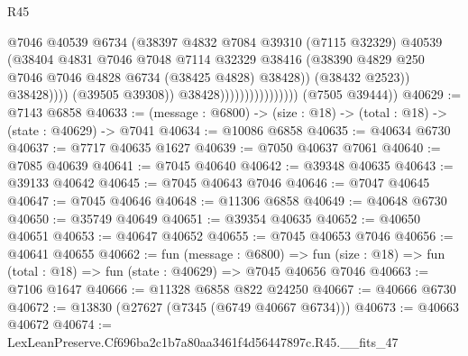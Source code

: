 \begin{lexlean}{R45}
\begin{coremodule}
{                                                @7046
                                                @40539
                                                @6734
                                                (@38397
                                                  @4832
                                                  @7084
                                                  @39310
                                                  (@7115 @32329)
                                                  @40539
                                                  (@38404
                                                    @4831
                                                    @7046
                                                    @7048
                                                    @7114
                                                    @32329
                                                    @38416
                                                    (@38390
                                                      @4829
                                                      @250
                                                      @7046
                                                      @7046
                                                      @4828
                                                      @6734
                                                      (@38425 @4828)
                                                      @38428))
                                                  (@38432 @2523))
                                                @38428))))
                                        (@39505 @39308))
                                      @38428))))))))))))))))
      (@7505 @39444))
@40629 := @7143 @6858
@40633 := (message : @6800) -> (size : @18) -> (total : @18) -> (state : @40629) -> @7041
@40634 := @10086 @6858
@40635 := @40634 @6730
@40637 := @7717 @40635 @1627
@40639 := @7050 @40637 @7061
@40640 := @7085 @40639
@40641 := @7045 @40640
@40642 := @39348 @40635
@40643 := @39133 @40642
@40645 := @7045 @40643 @7046
@40646 := @7047 @40645
@40647 := @7045 @40646
@40648 := @11306 @6858
@40649 := @40648 @6730
@40650 := @35749 @40649
@40651 := @39354 @40635
@40652 := @40650 @40651
@40653 := @40647 @40652
@40655 := @7045 @40653 @7046
@40656 := @40641 @40655
@40662 := fun (message : @6800) =>
  fun (size : @18) => fun (total : @18) => fun (state : @40629) => @7045 @40656 @7046
@40663 := @7106 @1647
@40666 := @11328 @6858 @822 @24250
@40667 := @40666 @6730
@40672 := @13830 (@27627 (@7345 (@6749 @40667 @6734)))
@40673 := @40663 @40672
@40674 := LexLeanPreserve.Cf696ba2c1b7a80aa3461f4d56447897c.R45.__fits_47
}
\end{coremodule}
\end{lexlean}
